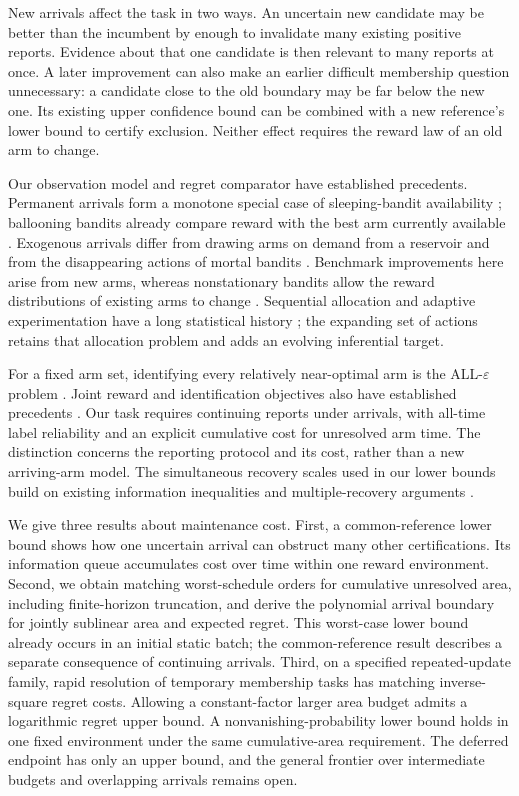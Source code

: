 \documentclass[11pt]{article}
\theoremstyle{remark}
\begin{document}
New arrivals affect the task in two ways. An uncertain new candidate may be
better than the incumbent by enough to invalidate many existing positive
reports. Evidence about that one candidate is then relevant to many
reports at once. A later improvement can also make an earlier difficult
membership question unnecessary: a candidate close to the old boundary may
be far below the new one. Its existing upper confidence bound can be
combined with a new reference's lower bound to certify exclusion. Neither
effect requires the reward law of an old arm to change.

Our observation model and regret comparator have established precedents.
Permanent arrivals form a monotone special case of sleeping-bandit
availability \citep{kleinberg2010}; ballooning bandits already compare reward
with the best arm currently available \citep{ghalme2021}. Exogenous arrivals
differ from drawing arms on demand from a reservoir
\citep{10.1214/aos/1069362389} and from the disappearing actions of mortal
bandits \citep{NIPS2008_788d9869}. Benchmark improvements here arise from new
arms, whereas nonstationary bandits allow the reward distributions of
existing arms to change \citep{Besbes2014,Auer2019ADSWITCH}. Sequential
allocation and adaptive experimentation have a long statistical history
\citep{Robbins1952,LAI19854,Lai1987}; the expanding set of actions retains
that allocation problem and adds an evolving inferential target.

For a fixed arm set, identifying every relatively near-optimal arm is the
ALL-$\varepsilon$ problem \citep{mason2020}. Joint reward and identification
objectives also have established precedents
\citep{degenne2019,yang2026,cho2025}. Our task requires continuing reports
under arrivals, with all-time label reliability and an explicit cumulative
cost for unresolved arm time. The distinction concerns the reporting
protocol and its cost, rather than a new arriving-arm model. The simultaneous
recovery scales used in our lower bounds build on existing information
inequalities and multiple-recovery arguments
\citep{kaufmann2016,malloy2014,jamieson2018}.

We give three results about maintenance cost. First, a common-reference
lower bound shows how one uncertain arrival can obstruct many other
certifications. Its information queue accumulates cost over time within
one reward environment. Second, we obtain matching worst-schedule orders
for cumulative unresolved area, including finite-horizon truncation, and
derive the polynomial arrival boundary for jointly sublinear area and
expected regret. This worst-case lower bound already occurs in an initial
static batch; the common-reference result describes a separate consequence
of continuing arrivals. Third, on a specified repeated-update family,
rapid resolution of temporary membership tasks has matching inverse-square
regret costs. Allowing a constant-factor larger area budget admits a
logarithmic regret upper bound. A nonvanishing-probability lower bound
holds in one fixed environment under the same cumulative-area requirement.
The deferred endpoint has only an upper bound, and the general frontier
over intermediate budgets and overlapping arrivals remains open.
\end{document}
